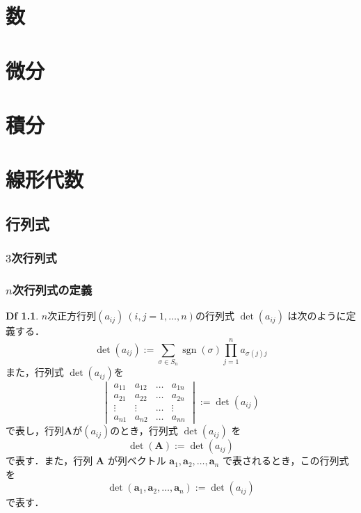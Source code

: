 \documentclass{book}　%
\theoremstyle{definition}
\newtheorem{dfn}[thm]{Df}
\newcommand{\edfn}{:=}
\DeclareMathOperator{\sgn}{\mathrm{sgn}}
\newcommand{\vA}{\boldsymbol{A}}
\newcommand{\va}{\boldsymbol{a}}
\begin{document}
	\tableofcontents
	\part{数}
	\part{微分}
	\part{積分}
	\part{線形代数}
		\chapter{行列式}
			\section{$3$次行列式}
			\section{$n$次行列式の定義}
				\begin{dfn} $n$次正方行列$(a_{i j}) \ (i,j = 1 ,\dots,n)$の行列式 $\det(a_{ij})$ は次のように定義する．
					\begin{equation}
						\det(a_{i j}) \edfn \sum_{\sigma \in S_n} \sgn(\sigma) \prod_{j=1}^{n} a_{\sigma(j) j}
					\end{equation}
					また，行列式 $\det(a_{i j})$を
					\begin{equation}
						\begin{vmatrix}
							a_{1 1} & a_{1 2} & \dots & a_{1 n} \\
							a_{2 1} & a_{2 2} & \dots & a_{2 n} \\
							\vdots & \vdots & \dots & \vdots \\
							a_{n 1} & a_{n 2} & \dots & a_{n n}
						\end{vmatrix}
						\edfn \det(a_{i j})
					\end{equation}
					で表し，行列$\vA$が$(a_{i j})$のとき，行列式 $\det(a_{i j})$ を
					\begin{equation}
						\det(\vA) \edfn \det(a_{i j})
					\end{equation}
					で表す．また，行列 $\vA$ が列ベクトル $\va_1, \va_2, \dots, \va_n$ で表されるとき，この行列式を
					\begin{equation}
						\det(\va_1,\va_2, \dots, \va_n) \edfn \det(a_{i j})
					\end{equation}
					で表す．
				\end{dfn}
\end{document}

